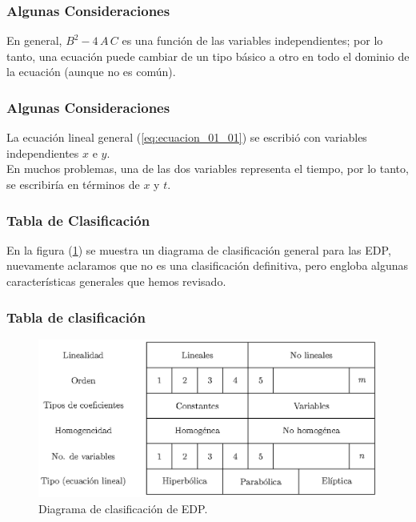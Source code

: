 \documentclass[12pt]{beamer}
\begin{document}
\begin{frame}
\frametitle{Algunas Consideraciones}
En general, $B^{2} - 4 \, A \, C$ es una función de las variables independientes; por lo tanto, una ecuación puede cambiar de un tipo básico a otro en todo el dominio de la ecuación (aunque no es común).
\end{frame}
\begin{frame}
\frametitle{Algunas Consideraciones}
La ecuación lineal general (\ref{eq:ecuacion_01_01}) se escribió con variables independientes $x$ e $y$.
\\
\bigskip
\pause
En muchos problemas, una de las dos variables representa el tiempo, por lo tanto, se escribiría en términos de $x$ y $t$.
\end{frame}
\begin{frame}
\frametitle{Tabla de Clasificación}
En la figura (\ref{fig:figura_clasificacion_EDP}) se muestra un diagrama de clasificación general para las EDP, nuevamente aclaramos que no es una clasificación definitiva, pero engloba algunas características generales que hemos revisado.
\end{frame}
\begin{frame}
\frametitle{Tabla de clasificación}
\begin{figure}[H]
    \centering
    \includegraphics[scale=0.87]{Imagenes/Cuadro_Clasificacion_EDP.eps}
    \caption{Diagrama de clasificación de EDP.}
    \label{fig:figura_clasificacion_EDP}
\end{figure}
\end{frame}
\end{document}
